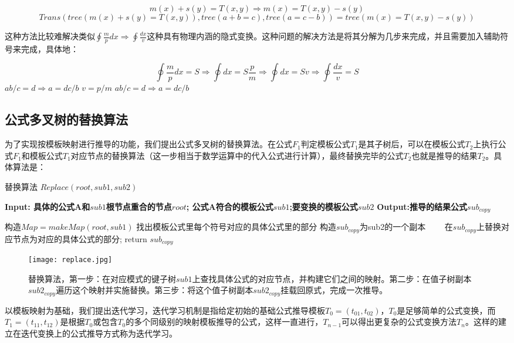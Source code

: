 \documentclass[runningheads]{llncs}
\begin{document}
$$m(x)+s(y)=T(x,y) \Rightarrow m(x)=T(x,y)-s(y)$$
$$Trans(tree(m(x)+s(y)=T(x,y)),tree(a+b=c),tree(a=c-b))=tree(m(x)=T(x,y)-s(y))$$

这种方法比较难解决类似$\oint{\frac{m}{p}dx} \Rightarrow \oint{\frac{dx}{v}}$这种具有物理内涵的隐式变换。这种问题的解决方法是将其分解为几步来完成，并且需要加入辅助符号来完成，具体地：

$$\oint{\frac{m}{p}dx}=S \Rightarrow \oint{dx}=S\frac{p}{m} \Rightarrow \oint{dx}=Sv \Rightarrow \oint{\frac{dx}{v}}=S$$
$ab/c=d \Rightarrow a=dc/b$ $v=p/m$  $ab/c=d \Rightarrow a=dc/b$


\subsection{公式多叉树的替换算法}
为了实现按模板映射进行推导的功能，我们提出公式多叉树的替换算法。在公式$F_1$判定模板公式$T_1$是其子树后，可以在模板公式$T_2$上执行公式$F_1$和模板公式$T_1$对应节点的替换算法（这一步相当于数学运算中的代入公式进行计算），最终替换完毕的公式$T_2$也就是推导的结果$T_2$。具体算法是：

\begin{algorithm}[t]
\caption{替换算法 $Replace(root,sub1,sub2)$} %
\hspace*{0.02in} {\bf Input: 具体的公式A和$sub1$根节点重合的节点$root$; 公式A符合的模板公式$sub1$;要变换的模板公式$sub2$} 
\hspace*{0.02in} {\bf Output:推导的结果公式$sub_{copy}$} 
\begin{algorithmic}[1]
\State 构造$Map = makeMap(root,sub1)$ 找出模板公式里每个符号对应的具体公式里的部分
\State 构造$sub_{copy}$为sub2的一个副本
　　\State 在$sub_{copy}$上替换对应节点为对应的具体公式的部分;
\EndFor
\State return $sub_{copy}$
\end{algorithmic}
\end{algorithm}

\begin{figure}[H]
\centering
\texttt{[image: replace.jpg]}
\caption{替换算法，第一步：在对应模式的键子树$sub1$上查找具体公式的对应节点，并构建它们之间的映射。第二步：在值子树副本$sub2_{copy}$遍历这个映射并实施替换。第三步：将这个值子树副本$sub2_{copy}$挂载回原式，完成一次推导。}
\end{figure}


以模板映射为基础，我们提出迭代学习，迭代学习机制是指给定初始的基础公式推导模板$T_0=(t_01,t_02)$，$T_0$是足够简单的公式变换，而$T_1=(t_11,t_12)$是根据$T_0$或包含$T_0$的多个同级别的映射模板推导的公式，这样一直进行，$T_{n-1}$可以得出更复杂的公式变换方法$T_{n}$。这样的建立在迭代变换上的公式推导方式称为迭代学习。
\end{document}
